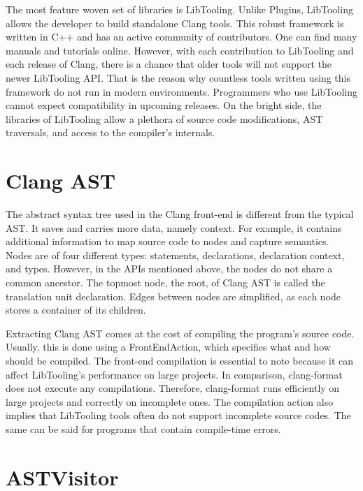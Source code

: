 The most feature woven set of libraries is LibTooling. 
Unlike Plugins, LibTooling allows the developer to build standalone 
Clang tools. 
This robust framework is written in C++ and has an active 
community of contributors. 
One can find many manuals and tutorials online. 
However, with each contribution to LibTooling and each release of Clang, 
there is a chance that older tools will not support the newer LibTooling 
API. 
That is the reason why countless tools written using this framework do not
run in modern environments. 
Programmers who use LibTooling cannot expect compatibility in upcoming 
releases. 
On the bright side, the libraries of LibTooling allow a plethora of source
code modifications, AST traversals, and access to the compiler's internals.

\section{Clang AST}

The abstract syntax tree used in the Clang front-end is different 
from the typical AST. 
It saves and carries more data, namely context.  
For example, it contains additional information to map source 
code to nodes and capture semantics.
Nodes are of four different types: statements, declarations, 
declaration context, and types. 
However, in the APIs mentioned above, the nodes do not share
a common ancestor. 
The topmost node, the root, of Clang AST is called the translation
unit declaration. 
Edges between nodes are simplified, as each node stores 
a container of its children.

Extracting Clang AST comes at the cost of compiling the program's
source code. 
Usually, this is done using a FrontEndAction, which specifies what 
and how should be compiled. 
The front-end compilation is essential to note because it can affect 
LibTooling's performance on large projects. 
In comparison, clang-format does not execute any compilations. 
Therefore, clang-format runs efficiently on large projects 
and correctly on incomplete ones. 
The compilation action also implies that LibTooling tools often 
do not support incomplete source codes. 
The same can be said for programs that contain compile-time errors.

\section{ASTVisitor}

